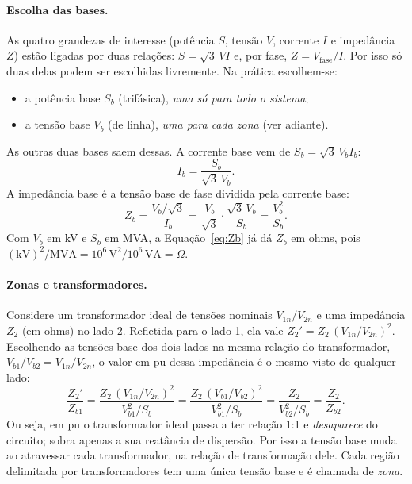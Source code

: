 \documentclass[a4paper,11pt]{article}
\numberwithin{equation}{section}
\numberwithin{figure}{section}
\numberwithin{table}{section}
\begin{document}
\paragraph{Escolha das bases.}
As quatro grandezas de interesse (potência $S$, tensão $V$, corrente $I$ e
impedância $Z$) estão ligadas por duas relações: $S = \sqrt{3}\,V I$ e,
por fase, $Z = V_{\text{fase}}/I$. Por isso só duas delas podem ser
escolhidas livremente. Na prática escolhem-se:
\begin{itemize}
  \item a potência base $S_b$ (trifásica), \emph{uma só para todo o sistema};
  \item a tensão base $V_b$ (de linha), \emph{uma para cada zona} (ver
        adiante).
\end{itemize}
As outras duas bases saem dessas. A corrente base vem de
$S_b = \sqrt{3}\,V_b I_b$:
\begin{equation}
  I_b = \frac{S_b}{\sqrt{3}\,V_b}.
  \label{eq:Ib}
\end{equation}
A impedância base é a tensão base de fase dividida pela corrente base:
\begin{equation}
  Z_b = \frac{V_b/\sqrt{3}}{I_b}
      = \frac{V_b}{\sqrt{3}}\cdot\frac{\sqrt{3}\,V_b}{S_b}
      = \frac{V_b^{2}}{S_b}.
  \label{eq:Zb}
\end{equation}
Com $V_b$ em kV e $S_b$ em MVA, a Equação~\eqref{eq:Zb} já dá $Z_b$ em ohms,
pois $(\text{kV})^2/\text{MVA} = 10^{6}\,\text{V}^2/10^{6}\,\text{VA} =
\Omega$.

\paragraph{Zonas e transformadores.}
Considere um transformador ideal de tensões nominais $V_{1n}/V_{2n}$ e uma
impedância $Z_2$ (em ohms) no lado 2. Refletida para o lado 1, ela vale
$Z_2' = Z_2\,(V_{1n}/V_{2n})^{2}$. Escolhendo as tensões base dos dois lados
na mesma relação do transformador, $V_{b1}/V_{b2} = V_{1n}/V_{2n}$, o valor
em pu dessa impedância é o mesmo visto de qualquer lado:
\begin{equation}
  \frac{Z_2'}{Z_{b1}}
  = \frac{Z_2\,(V_{1n}/V_{2n})^{2}}{V_{b1}^{2}/S_b}
  = \frac{Z_2\,(V_{b1}/V_{b2})^{2}}{V_{b1}^{2}/S_b}
  = \frac{Z_2}{V_{b2}^{2}/S_b}
  = \frac{Z_2}{Z_{b2}}.
  \label{eq:trafo-pu}
\end{equation}
Ou seja, em pu o transformador ideal passa a ter relação 1:1 e
\emph{desaparece} do circuito; sobra apenas a sua reatância de dispersão.
Por isso a tensão base muda ao atravessar cada transformador, na relação de
transformação dele. Cada região delimitada por transformadores tem uma única
tensão base e é chamada de \emph{zona}.
\end{document}
